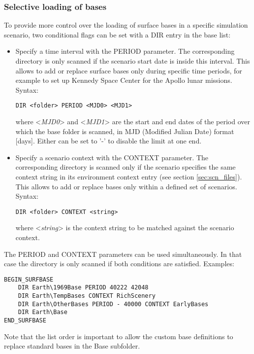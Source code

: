 \documentclass[Orbiter Developer Manual.tex]{subfiles}
\begin{document}
\subsubsection*{Selective loading of bases}
To provide more control over the loading of surface bases in a specific simulation scenario, two conditional flags can be set with a DIR entry in the base list:

\begin{itemize}
\item Specify a time interval with the PERIOD parameter. The corresponding directory is only scanned if the scenario start date is inside this interval. This allows to add or replace surface bases only during specific time periods, for example to set up Kennedy Space Center for the Apollo lunar missions. Syntax:

\begin{lstlisting}[language=OSFS]
DIR <folder> PERIOD <MJD0> <MJD1>
\end{lstlisting}

\noindent
where <\textit{MJD0}> and <\textit{MJD1}> are the start and end dates of the period over which the base folder is scanned, in MJD (Modified Julian Date) format [days]. Either can be set to '-' to disable the limit at one end.
\item Specify a scenario context with the CONTEXT parameter. The corresponding directory is scanned only if the scenario specifies the same context string in its environment context entry (see section \ref{sec:scn_files}). This allows to add or replace bases only within a defined set of scenarios. Syntax:

\begin{lstlisting}[language=OSFS]
DIR <folder> CONTEXT <string>
\end{lstlisting}

\noindent
where <\textit{string}> is the context string to be matched against the scenario context.
\end{itemize}

\noindent
The PERIOD and CONTEXT parameters can be used simultaneously. In that case the directory is only scanned if both conditions are satisfied. Examples:
\begin{lstlisting}[language=OSFS]
BEGIN_SURFBASE
	DIR Earth\1969Base PERIOD 40222 42048
	DIR Earth\TempBases CONTEXT RichScenery
	DIR Earth\OtherBases PERIOD - 40000 CONTEXT EarlyBases
	DIR Earth\Base
END_SURFBASE
\end{lstlisting}

\noindent
Note that the list order is important to allow the custom base definitions to replace standard bases in the Base subfolder.
\end{document}

